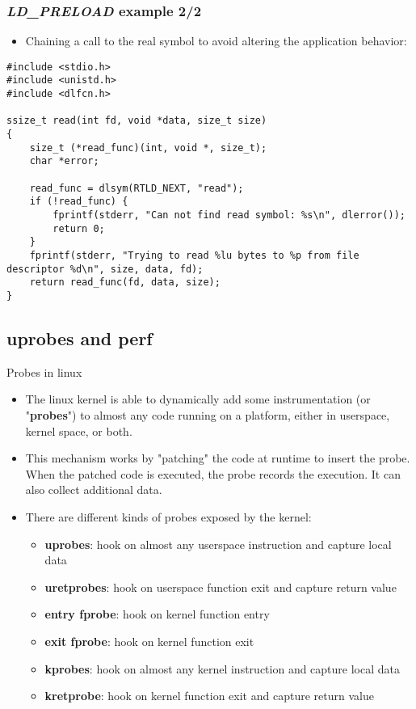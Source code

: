 \begin{frame}[fragile]
  \frametitle{{\em LD\_PRELOAD} example 2/2}
  \begin{itemize}
    \item Chaining a call to the real symbol to avoid altering the
	    application behavior:
  \end{itemize}
  \begin{block}{}
    \begin{verbatim}
#include <stdio.h>
#include <unistd.h>
#include <dlfcn.h>

ssize_t read(int fd, void *data, size_t size)
{
    size_t (*read_func)(int, void *, size_t);
    char *error;

    read_func = dlsym(RTLD_NEXT, "read");
    if (!read_func) {
        fprintf(stderr, "Can not find read symbol: %s\n", dlerror());
        return 0;
    }
    fprintf(stderr, "Trying to read %lu bytes to %p from file descriptor %d\n", size, data, fd);
    return read_func(fd, data, size);
}
    \end{verbatim}
  \end{block}
\end{frame}

\subsection{uprobes and perf}

\begin{frame}{Probes in linux}
	\begin{itemize}
    \item The linux kernel is able to dynamically add some instrumentation
      (or "\textbf{probes}") to almost any code running on a platform,
      either in userspace, kernel space, or both.
    \item This mechanism works by "patching" the code at runtime to insert
      the probe. When the patched code is executed, the probe records the
      execution. It can also collect additional data.
    \item There are different kinds of probes exposed by the kernel:
			\begin{itemize}
        \item \textbf{uprobes}: hook on almost any userspace instruction
          and capture local data
        \item \textbf{uretprobes}: hook on userspace function exit and
          capture return value
        \item \textbf{entry fprobe}: hook on kernel function entry
        \item \textbf{exit fprobe}: hook on kernel function exit
        \item \textbf{kprobes}: hook on almost any kernel instruction and
          capture local data
        \item \textbf{kretprobe}: hook on kernel function exit and capture
          return value
			\end{itemize}
	\end{itemize}
\end{frame}

